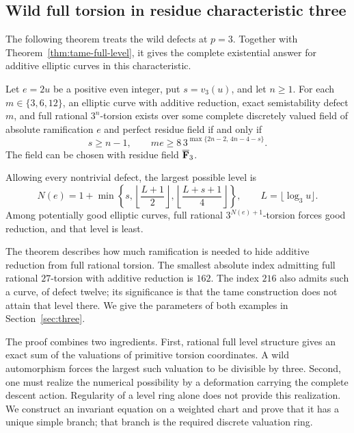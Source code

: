 

\subsection{Wild full torsion in residue characteristic three}
The following theorem treats the wild defects at $p=3$. Together with Theorem~\ref{thm:tame-full-level}, it gives the complete existential answer for additive elliptic curves in this characteristic.

\begin{theorem}\label{thm:three-range}
Let $e=2u$ be a positive even integer, put $s=v_3(u)$, and let $n\ge1$. For each $m\in\{3,6,12\}$, an elliptic curve with additive reduction, exact semistability defect $m$, and full rational $3^n$-torsion exists over some complete discretely valued field of absolute ramification $e$ and perfect residue field if and only if
\begin{equation}\label{eq:wild-criterion}
 s\ge n-1,\qquad
 me\ge 8\,3^{\max\{2n-2,\,4n-4-s\}}.
\end{equation}
The field can be chosen with residue field $\overline{\mathbf F}_3$.

Allowing every nontrivial defect, the largest possible level is
\begin{equation}\label{eq:maximum-three}
 N(e)=1+\min\left\{s,\left\lfloor\frac{L+1}{2}\right\rfloor,
                         \left\lfloor\frac{L+s+1}{4}\right\rfloor\right\},
 \qquad L=\lfloor\log_3u\rfloor.
\end{equation}
Among potentially good elliptic curves, full rational $3^{N(e)+1}$-torsion forces good reduction, and that level is least.
\end{theorem}

The theorem describes how much ramification is needed to hide additive reduction from full rational torsion. The smallest absolute index admitting full rational $27$-torsion with additive reduction is $162$. The index $216$ also admits such a curve, of defect twelve; its significance is that the tame construction does not attain that level there. We give the parameters of both examples in Section~\ref{sec:three}.

The proof combines two ingredients. First, rational full level structure gives an exact sum of the valuations of primitive torsion coordinates. A wild automorphism forces the largest such valuation to be divisible by three. Second, one must realize the numerical possibility by a deformation carrying the complete descent action. Regularity of a level ring alone does not provide this realization. We construct an invariant equation on a weighted chart and prove that it has a unique simple branch; that branch is the required discrete valuation ring.

